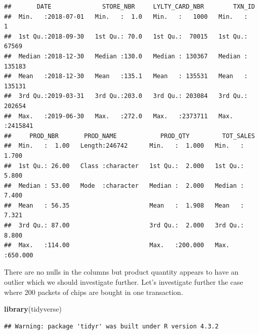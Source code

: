 \documentclass[
]{article}
\newenvironment{Shaded}{\begin{snugshade}}{\end{snugshade}}
\newcommand{\FunctionTok}[1]{\textcolor[rgb]{0.13,0.29,0.53}{\textbf{#1}}}
\newcommand{\NormalTok}[1]{#1}
\begin{document}
\begin{verbatim}
##       DATE              STORE_NBR     LYLTY_CARD_NBR        TXN_ID       
##  Min.   :2018-07-01   Min.   :  1.0   Min.   :   1000   Min.   :      1  
##  1st Qu.:2018-09-30   1st Qu.: 70.0   1st Qu.:  70015   1st Qu.:  67569  
##  Median :2018-12-30   Median :130.0   Median : 130367   Median : 135183  
##  Mean   :2018-12-30   Mean   :135.1   Mean   : 135531   Mean   : 135131  
##  3rd Qu.:2019-03-31   3rd Qu.:203.0   3rd Qu.: 203084   3rd Qu.: 202654  
##  Max.   :2019-06-30   Max.   :272.0   Max.   :2373711   Max.   :2415841  
##     PROD_NBR       PROD_NAME            PROD_QTY         TOT_SALES      
##  Min.   :  1.00   Length:246742      Min.   :  1.000   Min.   :  1.700  
##  1st Qu.: 26.00   Class :character   1st Qu.:  2.000   1st Qu.:  5.800  
##  Median : 53.00   Mode  :character   Median :  2.000   Median :  7.400  
##  Mean   : 56.35                      Mean   :  1.908   Mean   :  7.321  
##  3rd Qu.: 87.00                      3rd Qu.:  2.000   3rd Qu.:  8.800  
##  Max.   :114.00                      Max.   :200.000   Max.   :650.000
\end{verbatim}

There are no nulls in the columns but product quantity appears to have
an outlier which we should investigate further. Let's investigate
further the case where 200 packets of chips are bought in one
transaction.

\begin{Shaded}
\begin{Highlighting}[]
\FunctionTok{library}\NormalTok{(tidyverse)}
\end{Highlighting}
\end{Shaded}

\begin{verbatim}
## Warning: package 'tidyr' was built under R version 4.3.2
\end{verbatim}
\end{document}
